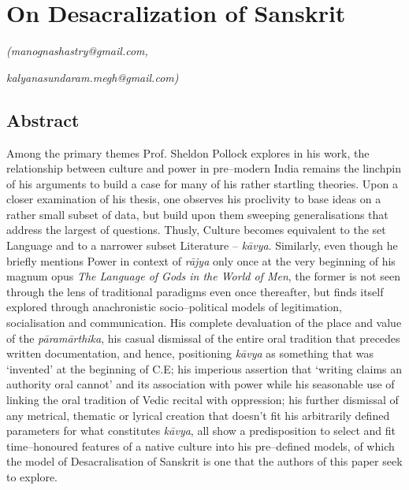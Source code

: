 
\chapter{On Desacralization of Sanskrit}\label{chapter6}


\begin{flushright}
\textit{(manognashastry@gmail.com,}
\end{flushright}

\begin{flushright}
\textit{kalyanasundaram.megh@gmail.com)}
\end{flushright}


\section*{Abstract}

Among the primary themes Prof. Sheldon Pollock explores in his work, the relationship between culture and power in pre–modern India remains the linchpin of his arguments to build a case for many of his rather startling theories. Upon a closer examination of his thesis, one observes his proclivity to base ideas on a rather small subset of data, but build upon them sweeping generalisations that address the largest of questions. Thusly, Culture becomes equivalent to the set Language and to a narrower subset Literature – \textit{kāvya}. Similarly, even though he briefly mentions Power in context of \textit{rājya} only once at the very beginning of his magnum opus \textit{The Language of Gods in the World of Men}, the former is not seen through the lens of traditional paradigms even once thereafter, but finds itself explored through anachronistic socio–political models of legitimation, socialisation and communication. His complete devaluation of the place and value of the \textit{pāramārthika}, his casual dismissal of the entire oral tradition that precedes written documentation, and hence, positioning \textit{kāvya} as something that was ‘invented’ at the beginning of C.E; his imperious assertion that ‘writing claims an authority oral cannot’ and its association with power while his seasonable use of linking the oral tradition of Vedic recital with oppression; his further dismissal of any metrical, thematic or lyrical creation that doesn’t fit his arbitrarily defined parameters for what constitutes \textit{kāvya}, all show a predisposition to select and fit time–honoured features of a native culture into his pre–defined models, of which the model of Desacralisation of Sanskrit is one that the authors of this paper seek to explore.


